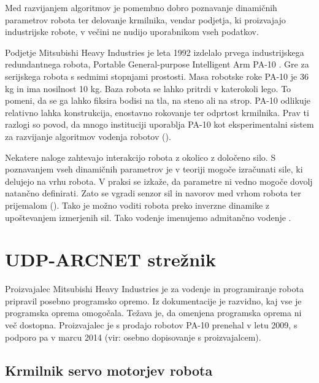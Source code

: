 \documentclass[a4paper]{article}
\begin{document}
Med razvijanjem algoritmov je pomembno dobro poznavanje dinamičnih parametrov robota ter delovanje krmilnika, vendar podjetja, ki proizvajajo industrijske robote, v večini ne nudijo uporabnikom vseh podatkov.

Podjetje Mitsubishi Heavy Industries je leta 1992 izdelalo prvega industrijskega redundantnega robota, Portable General-purpose Intelligent Arm PA-10 \cite{mhi_pa10}. Gre za serijskega robota s sedmimi stopnjami prostosti. Masa robotske roke PA-10 je 36 kg in ima nosilnost 10 kg. Baza robota se lahko pritrdi v katerokoli lego. To pomeni, da se ga lahko fiksira bodisi na tla, na steno ali na strop. PA-10 odlikuje relativno lahka konstrukcija, enostavno rokovanje ter odprtost krmilnika. Prav ti razlogi so povod, da mnogo instituciji uporablja PA-10 kot eksperimentalni sistem za razvijanje algoritmov vodenja robotov (\cite{voung_pa10,aalst_pa10,rodrigo_pa10,petric_nevronska}).

Nekatere naloge zahtevajo interakcijo robota z okolico z določeno silo. S poznavanjem vseh dinamičnih parametrov je v teoriji mogoče izračunati sile, ki delujejo na vrhu robota. V praksi se izkaže, da parametre ni vedno mogoče dovolj natančno definirati. Zato se vgradi senzor sil in navorov med vrhom robota ter prijemalom (\cite{almassri_pressure_sensor,mihelj_vodenje,eppinger_force_dynamics}). Tako je možno voditi robota preko inverzne dinamike z upoštevanjem izmerjenih sil. Tako vodenje imenujemo admitančno vodenje \cite{mihelj_hapt}.

	
\section{UDP-ARCNET strežnik}

Proizvajalec Mitsubishi Heavy Industries je za vodenje in programiranje robota pripravil posebno programsko opre\-mo. Iz dokumentacije je razvidno, kaj vse je programska oprema omogočala. Težava je, da omenjena programska oprema ni več dostopna. Proizvajalec je s prodajo robotov PA-10 prenehal v letu 2009, s podporo pa v marcu 2014 (vir: osebno dopisovanje s proizvajalcem). 

\subsection{Krmilnik servo motorjev robota} \label{sec:servo-drive}
\end{document}
